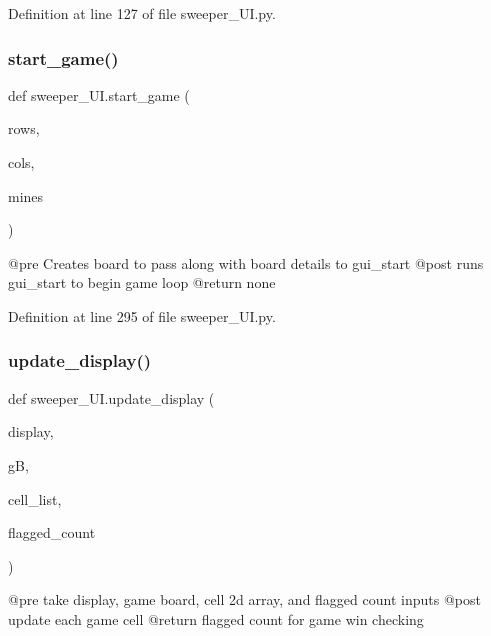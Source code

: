 Definition at line 127 of file sweeper\+\_\+\+U\+I.\+py.

\mbox{\label{namespacesweeper___u_i_a6d328451ee39123c0cb2af67b6a79379}} 
\subsubsection{\texorpdfstring{start\+\_\+game()}{start\_game()}}
{\footnotesize\ttfamily def sweeper\+\_\+\+U\+I.\+start\+\_\+game (\begin{DoxyParamCaption}\item[{}]{rows,  }\item[{}]{cols,  }\item[{}]{mines }\end{DoxyParamCaption})}

\begin{DoxyVerb}@pre Creates board to pass along with board details to gui_start
@post runs gui_start to begin game loop
@return none
\end{DoxyVerb}
 

Definition at line 295 of file sweeper\+\_\+\+U\+I.\+py.

\mbox{\label{namespacesweeper___u_i_a0b6997d23bebdf719e9ba3f83bb89b1a}} 
\subsubsection{\texorpdfstring{update\+\_\+display()}{update\_display()}}
{\footnotesize\ttfamily def sweeper\+\_\+\+U\+I.\+update\+\_\+display (\begin{DoxyParamCaption}\item[{}]{display,  }\item[{}]{gB,  }\item[{}]{cell\+\_\+list,  }\item[{}]{flagged\+\_\+count }\end{DoxyParamCaption})}

\begin{DoxyVerb}@pre take display, game board, cell 2d array, and flagged count inputs
@post update each game cell
@return flagged count for game win checking
\end{DoxyVerb}
 

